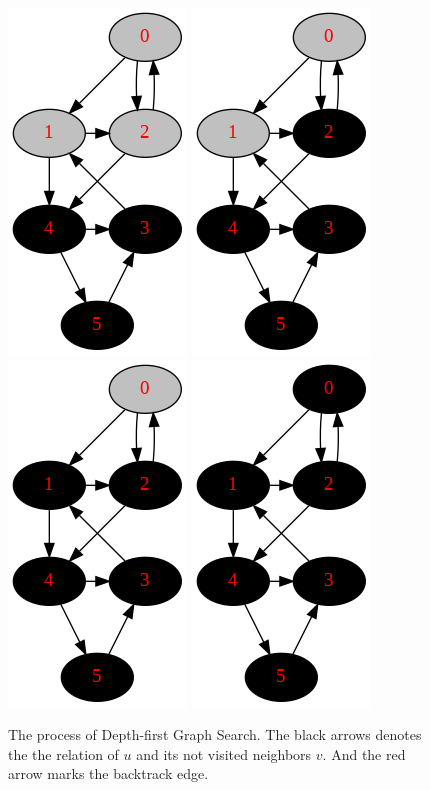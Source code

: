 \documentclass[main.tex]{subfiles}
\begin{document}
\begin{figure}[!ht]
        \includegraphics[width=0.2\columnwidth]{fig/depth_first_graph_search_process8.png}
    \includegraphics[width=0.2\columnwidth]{fig/depth_first_graph_search_process9.png}
    \includegraphics[width=0.2\columnwidth]{fig/depth_first_graph_search_process10.png}
    \includegraphics[width=0.2\columnwidth]{fig/depth_first_graph_search_process11.png}
    \caption{The process of Depth-first Graph Search. The black arrows denotes the the relation of $u$ and its not visited neighbors $v$. And the red arrow marks the backtrack edge. }
    \label{fig:depth_first_graph_search_process}
\end{figure}
\end{document}
